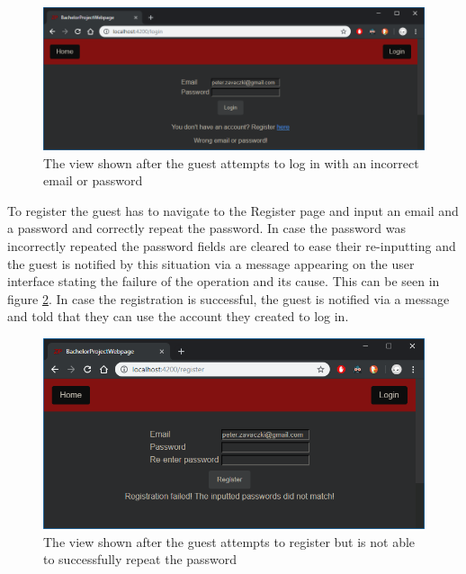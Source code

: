 \documentclass[12pt,a4paper,twoside]{report}
\begin{document}
\begin{figure}[ht]
  \centering
  \includegraphics[width=0.75\linewidth]{img/web_page_login.png}
  \caption[]{The view shown after the guest attempts to log in with an incorrect email or password}
  \label{fig:web_page_login}
\end{figure}

To register the guest has to navigate to the Register page and input an email and a password and correctly repeat the password. In case the password was incorrectly repeated the password fields are cleared to ease their re-inputting and the guest is notified by this situation via a message appearing on the user interface stating the failure of the operation and its cause. This can be seen in figure \ref{fig:web_page_register_user_guide}. In case the registration is successful, the guest is notified via a message and told that they can use the account they created to log in.

\begin{figure}[ht]
  \centering
  \includegraphics[width=0.75\linewidth]{img/web_page_register_pass_mismatch.png}
  \caption[]{The view shown after the guest attempts to register but is not able to successfully repeat the password}
  \label{fig:web_page_register_user_guide}
\end{figure}
\end{document}
